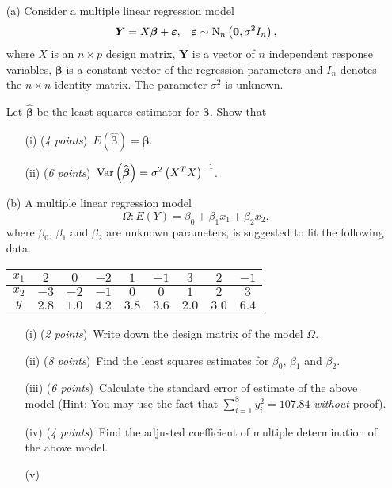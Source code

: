 \documentclass[12pt]{article}
\newcommand{\ds}{\displaystyle}
\newcommand{\bs}{\boldsymbol}
\begin{document}
\begin{enumerate}
\item[(a)]
Consider a multiple linear regression model
$$
\bs{Y} = X\bs{\beta} + \bs{\varepsilon}, \ \ \, \bs{\varepsilon} \sim {\rm N}_n\left({\bs 0}, \sigma^2 I_n\right),
$$
where $X$ is an $n \times p$ design matrix, $\bs{Y}$ is a vector of $n$ independent response variables, $\bs{\beta}$ is a constant vector of the regression parameters and $I_n$ denotes the $n \times n$ identity matrix. The parameter $\sigma^2$ is unknown.

Let $\ds \widehat{\bs{\beta}}$ be the least squares estimator for $\bs{\beta}$. Show that
\begin{enumerate}
\item[(i)]
({\em 4 points\/})~$\ds E\left(\widehat{\bs{\beta}}\right) = \bs{\beta}$.
\item[(ii)]
({\em 6 points\/})~$\ds {\rm Var}\left(\widehat{\bs{\beta}}\right) = \sigma^2 \left(X^T X\right)^{-1}$.
\end{enumerate}
\item[(b)]
A multiple linear regression model
$$
\Omega : E\left(Y\right) = \beta_0 + \beta_1 x_{1} + \beta_2 x_{2},
$$
where $\beta_0$, $\beta_1$ and $\beta_2$ are unknown parameters, is suggested to fit the following data.
\begin{center}
\begin{tabular}{|c||cccccccc|} \hline
$x_1$ & $2$ & $0$ & $-2$ & $1$ & $-1$ & $3$ & $2$ & $-1$ \\ \hline
$x_2$ & $-3$ & $-2$ & $-1$ & $0$ & $0$ & $1$ & $2$ & $3$ \\ \hline
$y$ & $2.8$ & $1.0$ & $4.2$ & $3.8$ & $3.6$ & $2.0$ & $3.0$ & $6.4$ \\ \hline
\end{tabular}
\end{center}
\begin{enumerate}
\item[(i)]
({\em 2 points\/})~Write down the design matrix of the model $\Omega$.
\item[(ii)]
({\em 8 points\/})~Find the least squares estimates for $\beta_0$, $\beta_1$ and $\beta_2$.
\item[(iii)]
({\em 6 points\/})~Calculate the standard error of estimate of the above model ({\sf Hint: You may use the fact that $\ds \sum_{i = 1}^{8} y_i^2 = 107.84$ {\em without\/} proof}).
\item[(iv)]
({\em 4 points\/})~Find the adjusted coefficient of multiple determination of the above model.
\item[(v)]

\end{enumerate}
\end{enumerate}
\end{document}
